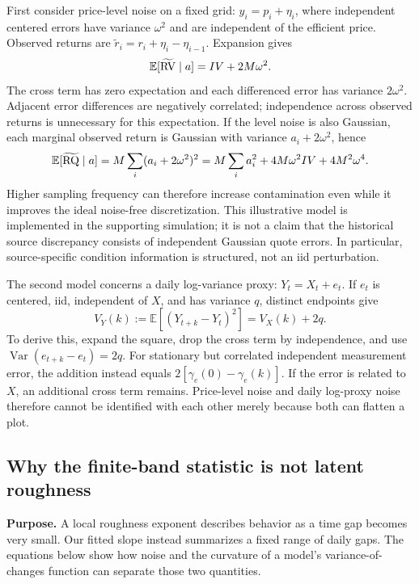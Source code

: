 First consider price-level noise on a fixed grid: $y_i=p_i+\eta_i$, where independent centered errors have variance $\omega^2$ and are independent of the efficient price. Observed returns are $\widetilde r_i=r_i+\eta_i-\eta_{i-1}$. Expansion gives
\begin{equation}
 \mathbb E[\widetilde{\operatorname{RV}}\mid a]=IV+2M\omega^2.\label{eq:pricenoise}
\end{equation}
The cross term has zero expectation and each differenced error has variance $2\omega^2$. Adjacent error differences are negatively correlated; independence across observed returns is unnecessary for this expectation. If the level noise is also Gaussian, each marginal observed return is Gaussian with variance $a_i+2\omega^2$, hence
\begin{equation}
 \mathbb E[\widetilde{\operatorname{RQ}}\mid a]
 =M\sum_i(a_i+2\omega^2)^2
 =M\sum_i a_i^2+4M\omega^2IV+4M^2\omega^4.\label{eq:rqnoise}
\end{equation}
Higher sampling frequency can therefore increase contamination even while it improves the ideal noise-free discretization. This illustrative model is implemented in the supporting simulation; it is not a claim that the historical source discrepancy consists of independent Gaussian quote errors. In particular, source-specific condition information is structured, not an iid perturbation.

The second model concerns a daily log-variance proxy: $Y_t=X_t+e_t$. If $e_t$ is centered, iid, independent of $X$, and has variance $q$, distinct endpoints give
\begin{equation}
 V_Y(k):=\mathbb E[(Y_{t+k}-Y_t)^2]=V_X(k)+2q.\label{eq:noisevariogram}
\end{equation}
To derive this, expand the square, drop the cross term by independence, and use $\operatorname{Var}(e_{t+k}-e_t)=2q$. For stationary but correlated independent measurement error, the addition instead equals $2[\gamma_e(0)-\gamma_e(k)]$. If the error is related to $X$, an additional cross term remains. Price-level noise and daily log-proxy noise therefore cannot be identified with each other merely because both can flatten a plot.

\subsection{Why the finite-band statistic is not latent roughness}\label{app:slope}
\textbf{Purpose.} A local roughness exponent describes behavior as a time gap becomes very small. Our fitted slope instead summarizes a fixed range of daily gaps. The equations below show how noise and the curvature of a model's variance-of-changes function can separate those two quantities.

